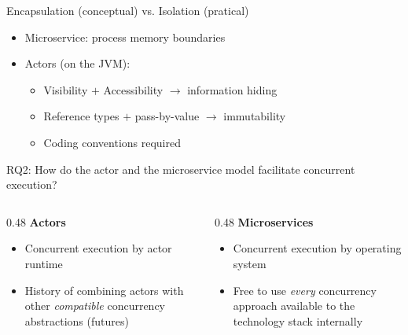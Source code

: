 \documentclass{beamer}
\begin{document}

\begin{frame}{Encapsulation (conceptual) vs. Isolation (pratical)}

\begin{itemize}
  \item Microservice: process memory boundaries
  \item Actors (on the JVM):
  \begin{itemize}
    \item Visibility $+$ Accessibility $\rightarrow$ information hiding
    \item Reference types $+$ pass-by-value $\rightarrow$ immutability
    \item Coding conventions required
  \end{itemize}
\end{itemize}

\end{frame}


\begin{frame}{RQ2: How do the actor and the microservice model facilitate concurrent execution?}

\begin{columns}
  \begin{column} {0.48\textwidth} 
    \textbf{Actors}
    \begin{itemize}
      \item Concurrent execution by actor runtime
      \item History of combining actors with other \textit{compatible} concurrency abstractions (futures)
    \end{itemize}
  \end{column}
  \begin{column} {0.48\textwidth}
    \textbf{Microservices} \\
    \begin{itemize}
      \item Concurrent execution by operating system
      \item Free to use \textit{every} concurrency approach available to the technology stack internally
    \end{itemize}
  \end{column}
\end{columns}

\end{frame}
\end{document}
